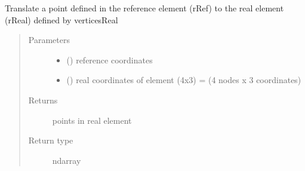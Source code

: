 \documentclass[letterpaper,10pt,english]{sphinxmanual}
\begin{document}
\begin{fulllineitems}
\label{\detokenize{petgem/hvfem:petgem.hvfem.getRealFromReference}}
Translate a point defined in the reference element (rRef) to the real element (rReal)
defined by verticesReal
\begin{quote}\begin{description}
\item[{Parameters}] \leavevmode\begin{itemize}
\item {} 
 () \textendash{} reference coordinates

\item {} 
 () \textendash{} real coordinates of element (4x3) = (4 nodes x 3 coordinates)

\end{itemize}

\item[{Returns}] \leavevmode
points in real element

\item[{Return type}] \leavevmode
ndarray

\end{description}\end{quote}

\end{fulllineitems}

\end{document}
